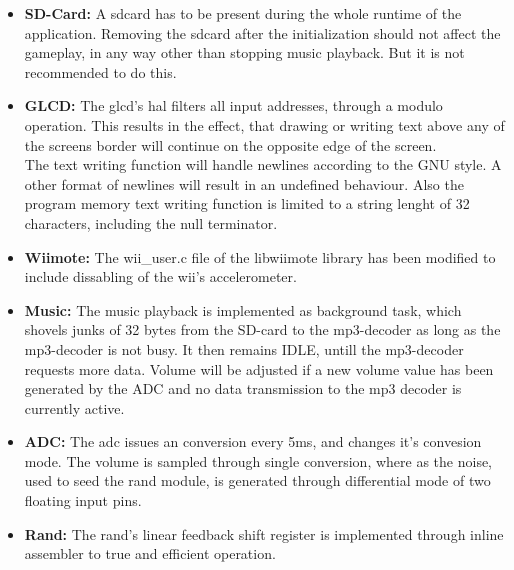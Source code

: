 \documentclass[12pt,a4paper,titlepage,oneside]{article}
\begin{document}
\begin{itemize}

    \item \textbf{SD-Card:} A sdcard has to be present during the whole runtime
        of the application. Removing the sdcard after the initialization should
        not affect the gameplay, in any way other than stopping music playback.
        But it is not recommended to do this. \\

    \item \textbf{GLCD:} The glcd's hal filters all input addresses, through
        a modulo operation. This results in the effect, that drawing or 
        writing text above any of the screens border will continue on the
        opposite edge of the screen. \\ 
        The text writing function will handle newlines according to the GNU
        style. A other format of newlines will result in an undefined behaviour.
        Also the program memory text writing function is limited to a string
        lenght of 32 characters, including the null terminator. \\

    \item \textbf{Wiimote:} The wii\_user.c file of the libwiimote library has 
        been modified to include dissabling of the wii's accelerometer. \\

    \item \textbf{Music:} The music playback is implemented as background task, which shovels junks of 32 bytes
        from the SD-card to the mp3-decoder as long as the mp3-decoder is not busy. It then remains
        IDLE, untill the mp3-decoder requests more data. Volume will be adjusted if a new 
        volume value has been generated by the ADC and no data transmission to the mp3 decoder
        is currently active. \\

    \item \textbf{ADC:} The adc issues an conversion every 5ms, and changes it's convesion mode. The volume
        is sampled through single conversion, where as the noise, used to seed the rand module, is generated 
        through differential mode of two floating input pins. \\
    
    \item \textbf{Rand:} The rand's linear feedback shift register is implemented through inline
        assembler to true and efficient operation. \\


\end{itemize}
\end{document}
